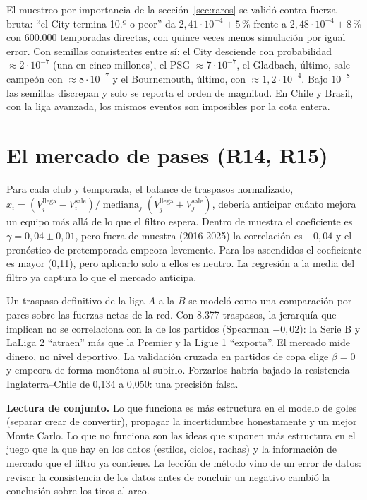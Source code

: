 El muestreo por importancia de la sección~\ref{sec:raros} se validó contra fuerza bruta: ``el City termina 10.º o peor'' da $2{,}41\cdot10^{-4}\pm5$\,\% frente a $2{,}48\cdot10^{-4}\pm8$\,\% con 600.000 temporadas directas, con quince veces menos simulación por igual error. Con semillas consistentes entre sí: el City desciende con probabilidad $\approx2\cdot10^{-7}$ (una en cinco millones), el PSG $\approx7\cdot10^{-7}$, el Gladbach, último, sale campeón con $\approx8\cdot10^{-7}$ y el Bournemouth, último, con $\approx1{,}2\cdot10^{-4}$. Bajo $10^{-8}$ las semillas discrepan y solo se reporta el orden de magnitud. En Chile y Brasil, con la liga avanzada, los mismos eventos son imposibles por la cota entera.

\section{El mercado de pases (R14, R15)}

 Para cada club y temporada, el balance de traspasos normalizado, $x_i=(V^\text{llega}_i-V^\text{sale}_i)/\operatorname{mediana}_j(V^\text{llega}_j+V^\text{sale}_j)$, debería anticipar cuánto mejora un equipo más allá de lo que el filtro espera. Dentro de muestra el coeficiente es $\gamma=0{,}04\pm0{,}01$, pero fuera de muestra (2016-2025) la correlación es $-0{,}04$ y el pronóstico de pretemporada empeora levemente. Para los ascendidos el coeficiente es mayor (0,11), pero aplicarlo solo a ellos es neutro. La regresión a la media del filtro ya captura lo que el mercado anticipa.

 Un traspaso definitivo de la liga $A$ a la $B$ se modeló como una comparación por pares sobre las fuerzas netas de la red. Con 8.377 traspasos, la jerarquía que implican no se correlaciona con la de los partidos (Spearman $-0{,}02$): la Serie B y LaLiga 2 ``atraen'' más que la Premier y la Ligue 1 ``exporta''. El mercado mide dinero, no nivel deportivo. La validación cruzada en partidos de copa elige $\beta=0$ y empeora de forma monótona al subirlo. Forzarlos habría bajado la resistencia Inglaterra–Chile de 0,134 a 0,050: una precisión falsa.

\begin{conclusion}
\textsf{\bfseries\color{cdblue}Lectura de conjunto.} Lo que funciona es más estructura en el modelo de goles (separar crear de convertir), propagar la incertidumbre honestamente y un mejor Monte Carlo. Lo que no funciona son las ideas que suponen más estructura en el juego que la que hay en los datos (estilos, ciclos, rachas) y la información de mercado que el filtro ya contiene. La lección de método vino de un error de datos: revisar la consistencia de los datos antes de concluir un negativo cambió la conclusión sobre los tiros al arco.
\end{conclusion}
